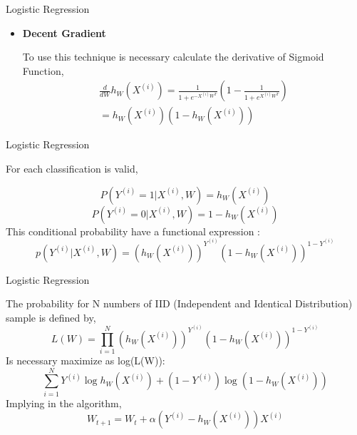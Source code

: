 \documentclass{beamer}
\begin{document}
\begin{frame}{Logistic Regression}
\begin{itemize}
\item \textbf{Decent Gradient }

To use this technique is necessary calculate the derivative of Sigmoid Function,
\begin{equation}
\begin{split}
\frac{d}{dW}h_W (X^{(i)}) = \frac{1}{1 + e^{-X^{(i)}W^T}}\left( 1 - \frac{1}{1 + e^{X^{(i)}W^T}} \right) \\= h_W(X^{(i)})(1 - h_W(X^{(i)}))
\end{split}
\end{equation}
\end{itemize}
\end{frame}


\begin{frame}{Logistic Regression}

For each classification is valid,

\begin{equation*}
P(Y^{(i)} = 1 | X^{(i)},W) =  h_W (X^{(i)})
\end{equation*}
\begin{equation*}
P(Y^{(i)} = 0 | X^{(i)},W) = 1 - h_W (X^{(i)})
\end{equation*}
This conditional probability have a functional expression :
\begin{equation}
p(Y^{(i)}|X^{(i)},W) = (h_W(X^{(i)}))^{Y^{(i)}}(1 - h_W(X^{(i)}))^{1-Y^{(i)}}
\end{equation}
\end{frame}

\begin{frame}{Logistic Regression}

The probability for N numbers of IID (Independent and Identical Distribution) sample is defined by, 
\begin{equation}
L(W) = \prod_{i = 1}^N (h_W(X^{(i)}))^{Y^{(i)}}(1 - h_W(X^{(i)}))^{1-Y^{(i)}}
\end{equation}
Is necessary maximize as log(L(W)):
\begin{equation}
\sum_{i=1}^N Y^{(i)} \log h_W(X^{(i)}) + (1 - Y^{(i)}) \log( 1 - h_W(X^{(i)}))
\end{equation}
Implying in the algorithm,
\begin{equation}
W_{t+1} = W_t + \alpha (Y^{(i)} - h_W(X^{(i)}))X^{(i)}
\end{equation}
\end{frame}
\end{document}
